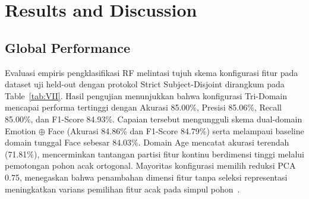 \section{Results and Discussion}
\label{sec:results_and_discussion}

\subsection{Global Performance}
\label{sec:global_performance}
\label{sec:global_performance_analysis}
\label{sec:global_classification_performance}

Evaluasi empiris pengklasifikasi RF melintasi tujuh skema konfigurasi fitur pada dataset uji held-out dengan protokol Strict Subject-Disjoint dirangkum pada Table~\ref{tab:VII}. Hasil pengujian menunjukkan bahwa konfigurasi Tri-Domain mencapai performa tertinggi dengan Akurasi 85.00\%, Presisi 85.06\%, Recall 85.00\%, dan F1-Score 84.93\%. Capaian tersebut mengungguli skema dual-domain Emotion $\oplus$ Face (Akurasi 84.86\% dan F1-Score 84.79\%) serta melampaui baseline domain tunggal Face sebesar 84.03\%. Domain Age mencatat akurasi terendah (71.81\%), mencerminkan tantangan partisi fitur kontinu berdimensi tinggi melalui pemotongan pohon acak ortogonal. Mayoritas konfigurasi memilih reduksi PCA 0.75, menegaskan bahwa penambahan dimensi fitur tanpa seleksi representasi meningkatkan varians pemilihan fitur acak pada simpul pohon~\cite{ref48}.

